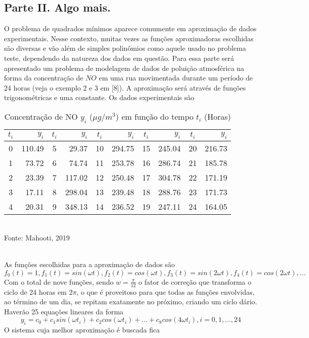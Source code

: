 \documentclass[a4paper, 12pt]{article}
\begin{document}
\subsection{Parte II. Algo mais.}
O problema de quadrados mínimos aparece comumente em aproximação de dados experimentais. Nesse contexto, muitas vezes as funções aproximadoras escolhidas são diversas e vão além de simples polinômios como aquele usado no problema teste, dependendo da natureza dos dados em questão. Para essa parte será apresentado um problema de modelagem de dados de poluição atmosférica na forma da concentração de $NO$  em uma rua movimentada durante um período de 24 horas (veja o exemplo 2 e 3 em [8]). A aproximação será através de funções trigonométricas e uma constante. Os dados experimentais são
\begin{table}[h]
\centering
\caption{\label{tab:no} Concentração de NO $y_i$ ($\mu g/m^3$) em função do tempo $t_i$ (Horas)}
\begin{tabular}{|c r|c r|c r|c r|c r|}
\hline$t_i$ &$y_i$ &$t_i$ &$y_i$ &$t_i$ &$y_i$ &$t_i$ &$y_i$ &$t_i$ &$y_i$\\
\hline 0 &110.49 &5 &29.37 &10 &294.75 &15 &245.04 &20 &216.73\\
1 &73.72 &6 &74.74 &11 &253.78 &16 &286.74 &21 &185.78\\
2 &23.39 &7 &117.02 &12 &250.48 &17 &304.78 &22 &171.19\\
3 &17.11 &8 &298.04 &13 &239.48 &18 &288.76 &23 &171.73\\
4 &20.31 &9 &348.13 &14 &236.52 &19 &247.11 &24 &164.05\\
\hline
\end{tabular}
\\Fonte: Mahooti, 2019
\end{table}
\\
As funções escolhidas para a aproximação de dados são 
\[
f_0(t) = 1, f_1(t) = sin(\omega t), f_2(t) = cos(\omega t), f_3(t) = sin(2\omega t), f_4(t) = cos(2\omega t), ...
\]
Com o total de nove funções, sendo $w=\frac{\pi}{12}$ o fator de correção que transforma o ciclo de 24 horas em $2\pi$, o que é proveitoso para que todas as funções envolvidas, ao término de um dia, se repitam exatamente no próximo, criando um ciclo dário. Haverão 25 equações lineares da forma
\[
y_i = c_0 + c_1sin(\omega t_i) + c_2cos(\omega t_i)+...+ c_8cos(4\omega t_i), i = 0, 1, . . . , 24
\]
O sistema cuja melhor aproximação é buscada fica
\end{document}
